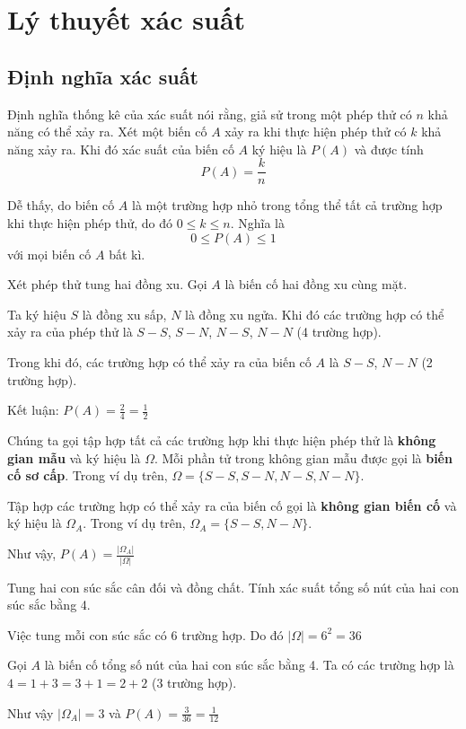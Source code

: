 \chapter{Lý thuyết xác suất}

\section{Định nghĩa xác suất}

\begin{definition}
    Định nghĩa thống kê của xác suất nói rằng, giả sử trong một phép thử có $n$ khả năng có thể xảy ra. Xét một biến cố $A$ xảy ra khi thực hiện phép thử có $k$ khả năng xảy ra. Khi đó xác suất của biến cố $A$ ký hiệu là $P(A)$ và được tính \[P(A) = \frac{k}{n}\]
\end{definition}

Dễ thấy, do biến cố $A$ là một trường hợp nhỏ trong tổng thể tất cả trường hợp khi thực hiện phép thử, do đó $0 \leq k \leq n$. Nghĩa là \[0 \leq P(A) \leq 1\] với mọi biến cố $A$ bất kì.

\begin{example}
    Xét phép thử tung hai đồng xu. Gọi $A$ là biến cố hai đồng xu cùng mặt.
    
    Ta ký hiệu $S$ là đồng xu sấp, $N$ là đồng xu ngửa. Khi đó các trường hợp có thể xảy ra của phép thử là $S-S$, $S-N$, $N-S$, $N-N$ (4 trường hợp). 
    
    Trong khi đó, các trường hợp có thể xảy ra của biến cố $A$ là $S-S$, $N-N$ (2 trường hợp).
    
    Kết luận: $P(A) = \frac{2}{4} = \frac{1}{2}$
\end{example}

Chúng ta gọi tập hợp tất cả các trường hợp khi thực hiện phép thử là \textbf{không gian mẫu} và ký hiệu là $\Omega$. Mỗi phần tử trong không gian mẫu được gọi là \textbf{biến cố sơ cấp}. Trong ví dụ trên, $\Omega = \{S-S, S-N, N-S, N-N\}$.
    
Tập hợp các trường hợp có thể xảy ra của biến cố gọi là \textbf{không gian biến cố} và ký hiệu là $\Omega_A$. Trong ví dụ trên, $\Omega_A = \{S-S, N-N\}$.
    
Như vậy, $P(A) = \frac{|\Omega_A|}{|\Omega|}$

\begin{example}
    Tung hai con súc sắc cân đối và đồng chất. Tính xác suất tổng số nút của hai con súc sắc bằng 4.
    
    Việc tung mỗi con súc sắc có 6 trường hợp. Do đó $|\Omega| = 6^2 = 36$
    
    Gọi $A$ là biến cố tổng số nút của hai con súc sắc bằng 4. Ta có các trường hợp là $4=1+3=3+1=2+2$ (3 trường hợp).
    
    Như vậy $|\Omega_A| = 3$ và $P(A) = \frac{3}{36} = \frac{1}{12}$
\end{example}

